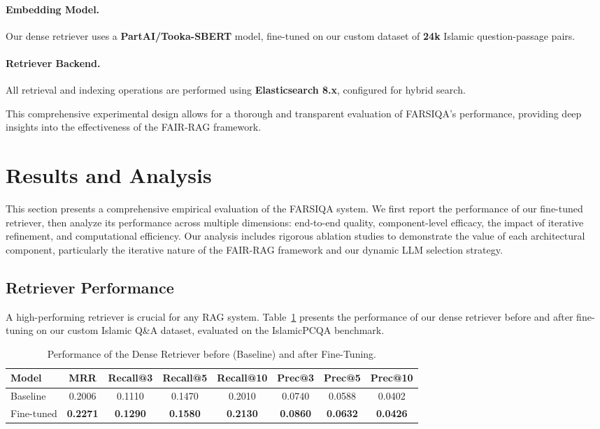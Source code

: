 \documentclass[11pt]{article}
\begin{document}
\paragraph{Embedding Model.}
Our dense retriever uses a \textbf{PartAI/Tooka-SBERT} model, fine-tuned on our custom dataset of \textbf{24k} Islamic question-passage pairs.

\paragraph{Retriever Backend.}
All retrieval and indexing operations are performed using \textbf{Elasticsearch 8.x}, configured for hybrid search.

This comprehensive experimental design allows for a thorough and transparent evaluation of FARSIQA's performance, providing deep insights into the effectiveness of the FAIR-RAG framework.

\section{Results and Analysis}

This section presents a comprehensive empirical evaluation of the FARSIQA system. We first report the performance of our fine-tuned retriever, then analyze its performance across multiple dimensions: end-to-end quality, component-level efficacy, the impact of iterative refinement, and computational efficiency. Our analysis includes rigorous ablation studies to demonstrate the value of each architectural component, particularly the iterative nature of the FAIR-RAG framework and our dynamic LLM selection strategy.

\subsection{Retriever Performance}

A high-performing retriever is crucial for any RAG system. Table~\ref{tab:retriever-performance} presents the performance of our dense retriever before and after fine-tuning on our custom Islamic Q\&A dataset, evaluated on the IslamicPCQA benchmark.

\begin{table}[t]
\centering
\small
\begin{tabular}{lccccccc}
\hline
\textbf{Model} & \textbf{MRR} & \textbf{Recall@3} & \textbf{Recall@5} & \textbf{Recall@10} & \textbf{Prec@3} & \textbf{Prec@5} & \textbf{Prec@10} \\
\hline
Baseline & 0.2006 & 0.1110 & 0.1470 & 0.2010 & 0.0740 & 0.0588 & 0.0402 \\
Fine-tuned & \textbf{0.2271} & \textbf{0.1290} & \textbf{0.1580} & \textbf{0.2130} & \textbf{0.0860} & \textbf{0.0632} & \textbf{0.0426} \\
\hline
\end{tabular}
\caption{Performance of the Dense Retriever before (Baseline) and after Fine-Tuning.}
\label{tab:retriever-performance}
\end{table}
\end{document}
